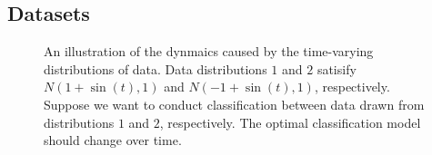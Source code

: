 \documentclass{article}
\begin{document}
\subsection{Datasets}

\begin{figure}[!]
\setlength{\abovecaptionskip}{0pt}
\setlength{\belowcaptionskip}{0pt}
\centering 
{}
\caption{An illustration of the dynmaics caused by the time-varying distributions of data. Data distributions $1$ and $2$ satisify $N(1+\sin(t), 1)$ and $N(-1+\sin(t), 1)$, respectively.  Suppose we want to conduct classification between data drawn from distributions $1$ and $2$, respectively. The optimal classification model should change over time.}
\label{figure_illus_dynamics}
\end{figure}
\end{document}
